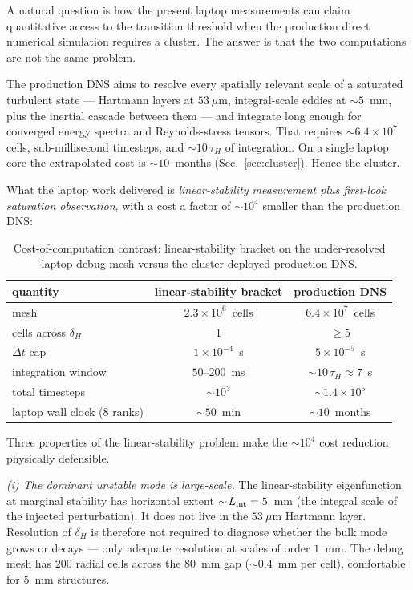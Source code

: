 \documentclass[aps,prl,twocolumn,superscriptaddress]{revtex4-2}
\begin{document}
A natural question is how the present laptop measurements can claim
quantitative access to the transition threshold when the production
direct numerical simulation requires a cluster.  The answer is that
the two computations are not the same problem.

The production DNS aims to resolve every spatially relevant scale
of a saturated turbulent state --- Hartmann layers at $53~\mu$m,
integral-scale eddies at $\sim\!5$~mm, plus the inertial cascade
between them --- and integrate long enough for converged energy
spectra and Reynolds-stress tensors.  That requires
$\sim\!6.4\!\times\!10^{7}$ cells, sub-millisecond timesteps, and
$\sim\!10\,\tau_H$ of integration.  On a single laptop core the
extrapolated cost is $\sim\!10$~months (Sec.~\ref{sec:cluster}).
Hence the cluster.

What the laptop work delivered is \emph{linear-stability measurement
plus first-look saturation observation}, with a cost a factor of
$\sim\!10^{4}$ smaller than the production DNS:

\begin{table}[h!]
\centering
\caption{Cost-of-computation contrast: linear-stability bracket on
the under-resolved laptop debug mesh versus the cluster-deployed
production DNS.}
\label{tab:cost_contrast}
\begin{tabular}{|l|c|c|}\hline
quantity & linear-stability bracket & production DNS \\ \hline
mesh & $2.3\!\times\!10^{6}$~cells & $6.4\!\times\!10^{7}$~cells \\
cells across $\delta_H$ & $1$ & $\ge 5$ \\
$\Delta t$ cap & $1\!\times\!10^{-4}$~s & $5\!\times\!10^{-5}$~s \\
integration window & $50$--$200$~ms & $\sim\!10\,\tau_H \approx 7$~s \\
total timesteps & $\sim\!10^{3}$ & $\sim\!1.4\!\times\!10^{5}$ \\
laptop wall clock (8 ranks) & $\sim\!50$~min & $\sim\!10$~months \\ \hline
\end{tabular}
\end{table}

Three properties of the linear-stability problem make the
$\sim\!10^{4}$ cost reduction physically defensible.

\textit{(i) The dominant unstable mode is large-scale.}  The
linear-stability eigenfunction at marginal stability has horizontal
extent $\sim\!L_{\rm int} = 5$~mm (the integral scale of the
injected perturbation).  It does not live in the $53~\mu$m Hartmann
layer.  Resolution of $\delta_H$ is therefore not required to
diagnose whether the bulk mode grows or decays --- only adequate
resolution at scales of order $1$~mm.  The debug mesh has $200$
radial cells across the $80$~mm gap ($\sim\!0.4$~mm per cell),
comfortable for $5$~mm structures.
\end{document}
